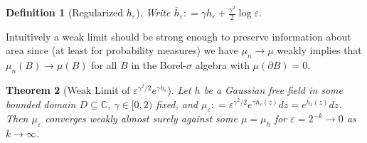 \documentclass[11pt,reqno]{amsart}
\numberwithin{equation}{section}
\newtheorem{thm}{Theorem}[section]
\newtheorem{defi}[thm]{Definition}
\newcommand{\deq}{\mathrel{\mathop:}=}
\newcommand{\eps}{\varepsilon}
\begin{document}
\begin{defi}[Regularized $h_\eps$]
	Write $\overline h_\eps\deq \gamma h_\eps+\frac{\gamma^2}{2}\log\eps$.
\end{defi}


Intuitively a weak limit should be strong enough to preserve information about area since (at least for probability measures) we have $\mu_n\rightarrow\mu$ weakly implies that $\mu_n(B)\rightarrow\mu(B)$ for all $B$ in the Borel-$\sigma$ algebra with $\mu(\partial B)=0$.

\begin{thm}[Weak Limit of $\eps^{\gamma^2/2}e^{\gamma h_\eps}$]\label{thm:weaklimitofmueps}
	Let $h$ be a Gaussian free field in some bounded domain $D\subseteq\mathbb C$, $\gamma \in [0,2)$ fixed, and $\mu_\eps\deq\eps^{\gamma^2/2}e^{\gamma h_\eps(z)}dz = e^{\overline h_\eps(z)}dz$. Then $\mu_\eps$ converges weakly almost surely against some $\mu=\mu_h$ for $\eps=2^{-k}\rightarrow 0$ as $k\rightarrow \infty$.
\end{thm}
\end{document}
